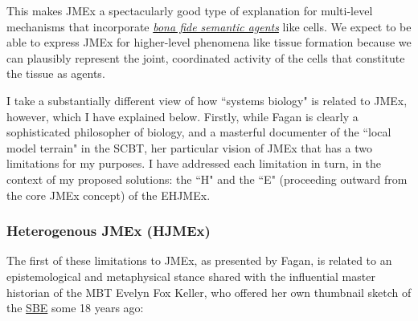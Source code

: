 This makes JMEx a spectacularly good type of explanation for multi-level mechanisms that incorporate \hyperref[agentmodel]{\textit{bona fide semantic agents}} like cells. We expect to be able to express JMEx for higher-level phenomena like tissue formation because we can plausibly represent the joint, coordinated activity of the cells that constitute the tissue as agents.

I take a substantially different view of how ``systems biology" is related to JMEx, however, which I have explained below. Firstly, while Fagan is clearly a sophisticated philosopher of biology, and a masterful documenter of the ``local model terrain" in the SCBT, her particular vision of JMEx that has a two limitations for my purposes. I have addressed each limitation in turn, in the context of my proposed solutions: the ``H" and the ``E" (proceeding outward from the core JMEx concept) of the EHJMEx.

\subsubsection{Heterogenous JMEx (HJMEx)}

 The first of these limitations to JMEx, as presented by Fagan, is related to an epistemological and metaphysical stance shared with the influential master historian of the MBT Evelyn Fox Keller, who offered her own thumbnail sketch of the \hyperref[SBE]{SBE} some 18 years ago:

